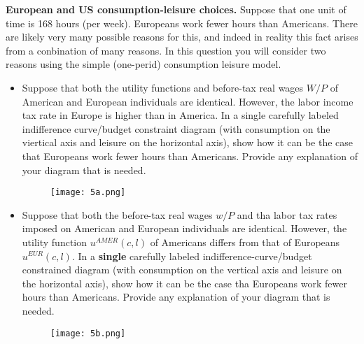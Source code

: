 \documentclass[11pt]{SelfArxOneColBMN}
\begin{document}
\begin{exercise}
	\textbf{European and US consumption-leisure choices.} Suppose that one unit of time is 168 hours (per week). Europeans work fewer hours than Americans. There are likely very many possible reasons for this, and indeed in reality this fact arises from a conbination of many reasons. In this question you will consider two reasons using the simple (one-perid) consumption leisure model.
	\begin{itemize}
		\item Suppose that both the utility functions and before-tax real wages $W / P$ of American and European individuals are identical. However, the labor income tax rate in Europe is higher than in America. In a single carefully labeled indifference curve/budget constraint diagram (with consumption on the viertical axis and leisure on the horizontal axis), show how it can be the case that Europeans work fewer hours than Americans. Provide any explanation of your diagram that is needed.
		\begin{figure}
                        \texttt{[image: 5a.png]}
                \end{figure}
		\item Suppose that both the before-tax real wages $w / P$ and tha labor tax rates imposed on American and European individuals are identical. However, the utility function $u^{AMER}(c,l)$ of Americans differs from that of Europeans $u^{EUR}(c,l)$. In a \textbf{single} carefully labeled indifference-curve/budget constrained diagram (with consumption on the vertical axis and leisure on the horizontal axis), show how it can be the case tha Europeans work fewer hours than Americans. Provide any explanation of your diagram that is needed. 
		\begin{figure}
			\texttt{[image: 5b.png]}
		\end{figure}
	\end{itemize}
\end{exercise}
\end{document}
